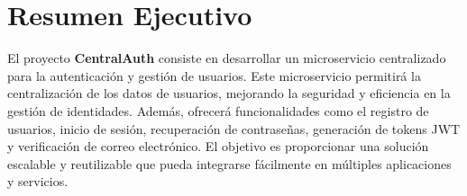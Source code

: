 \section{Resumen Ejecutivo}
El proyecto \textbf{CentralAuth} consiste en desarrollar un microservicio centralizado para la autenticación y gestión de usuarios. Este microservicio permitirá la centralización de los datos de usuarios, mejorando la seguridad y eficiencia en la gestión de identidades. Además, ofrecerá funcionalidades como el registro de usuarios, inicio de sesión, recuperación de contraseñas, generación de tokens JWT y verificación de correo electrónico. El objetivo es proporcionar una solución escalable y reutilizable que pueda integrarse fácilmente en múltiples aplicaciones y servicios.


